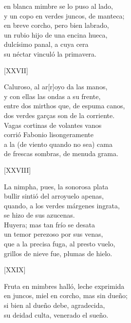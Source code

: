 \documentclass[11pt,a4paper,twoside]{article}
\begin{document}
en blanca mimbre se lo puso al lado,\\
y un copo en verdes juncos, de manteca;\\
en breve corcho, pero bien labrado,\\
un rubio hijo de una encina hueca,\\
dulcísimo panal, a cuya cera\\
su néctar vinculó la primavera.\pend
\begin{center}
	[XXVII]
\end{center}\pstart
Caluroso, al ar[r]oyo da las manos,\\
y con ellas las ondas a su frente,\\
entre dos mirthos que, de espuma canos,\\
dos verdes garças son de la corriente.\\
Vagas cortinas de volantes vanos\\
corrió Fabonio lisongeramente\\
a la (de viento quando no sea) cama\\
de frescas sombras, de menuda grama.\pend
\begin{center}
	[XXVIII]
\end{center}\pstart
La nimpha, pues, la sonorosa plata\\
bullir sintió del arroyuelo apenas,\\
quando, a los verdes márgenes ingrata,\\
 se hizo de sus azucenas.\\
Huyera; mas tan frío se desata\\
un temor perezoso por sus venas,\\
que a la precisa fuga, al presto vuelo,\\
grillos de nieve fue, plumas de hielo.\pend
\begin{center}
	[XXIX]
\end{center}\pstart
Fruta en mimbres halló, leche exprimida\\
en juncos, miel en corcho, mas sin dueño;\\
si bien al dueño debe, agradecida,\\
su deidad culta, venerado el sueño.\\
\end{document}
